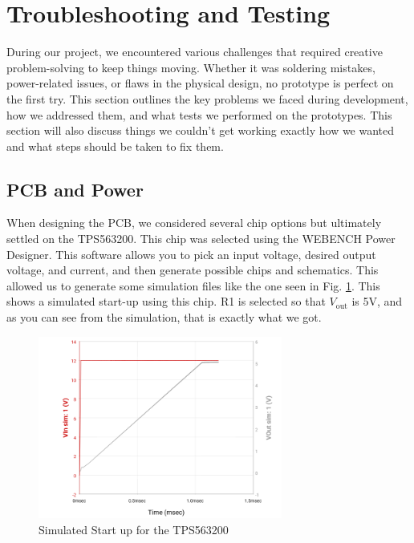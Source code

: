 \section{Troubleshooting and Testing}
During our project, we encountered various challenges that required creative problem-solving to keep things moving. Whether it was soldering mistakes, power-related issues, or flaws in the physical design, no prototype is perfect on the first try. This section outlines the key problems we faced during development, how we addressed them, and what tests we performed on the prototypes. This section will also discuss things we couldn't get working exactly how we wanted and what steps should be taken to fix them.
\subsection{PCB and Power}
When designing the PCB, we considered several chip options but ultimately settled on the TPS563200. This chip was selected using the WEBENCH Power Designer. This software allows you to pick an input voltage, desired output voltage, and current, and then generate possible chips and schematics. This allowed us to generate some simulation files like the one seen in Fig. \ref{fig:Vout}. This shows a simulated start-up using this chip. R1 is selected so that \(V_{\text{out}}\) is 5V, and as you can see from the simulation, that is exactly what we got.
\begin{figure}[H]
    \centering
    \includegraphics[height=6cm]{Vout_chart.png}
     \caption{Simulated Start up for the TPS563200}
    \label{fig:Vout}
\end{figure}
